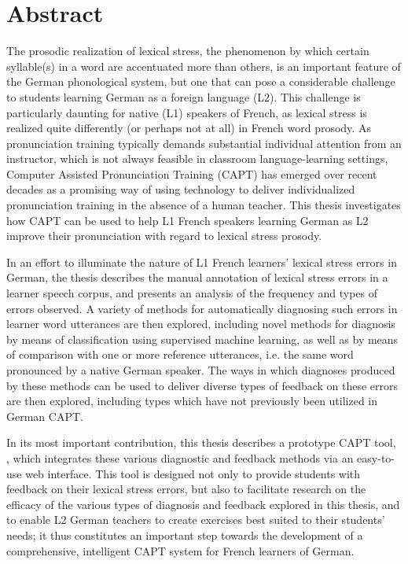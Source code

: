 %
\chapter*{Abstract}
\label{sec:abstract}
\vspace*{-10mm}

The prosodic realization of lexical stress, the phenomenon by which certain syllable(s) in a word are accentuated more than others, is an important feature of the German phonological system, but one that can pose a considerable challenge to students learning German as a foreign language (L2). This challenge is particularly daunting for native (L1) speakers of French, as lexical stress is realized quite differently (or perhaps not at all) in French word prosody.
As pronunciation training typically demands substantial individual attention from an instructor, which is not always feasible in classroom language-learning settings, Computer Assisted Pronunciation Training (CAPT) has emerged over recent decades as a promising way of using technology to deliver individualized pronunciation training in the absence of a human teacher.
This thesis investigates how CAPT can be used to help L1 French speakers learning German as L2 improve their pronunciation with regard to lexical stress prosody.

In an effort to illuminate the nature of L1 French learners' lexical stress errors in German, the thesis 
describes the manual annotation of lexical stress errors in a learner speech corpus,
and presents an analysis of the frequency and types of errors observed.
A variety of methods for automatically diagnosing such errors in learner word utterances are then explored, including novel methods for diagnosis by means of classification using supervised machine learning, as well as by means of comparison with one or more reference utterances, i.e. the same word pronounced by a native German speaker.
The ways in which diagnoses produced by these methods can be used to deliver diverse types of feedback on these errors are then explored, including types which have not previously been utilized in German CAPT. 

In its most important contribution, this thesis describes a prototype CAPT tool, ,
which integrates these various diagnostic and feedback methods via an easy-to-use web interface. 
This tool is designed not only to provide students with feedback on their lexical stress errors, but also to facilitate research on the efficacy of the various
 types of diagnosis and feedback
 explored in this thesis, and to enable L2 German teachers 
 to create exercises best suited to their students' needs; it thus constitutes an important step towards the development of a comprehensive, intelligent CAPT system for French learners of German. 




%
